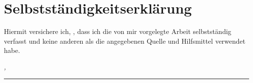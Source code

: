 %
\chapter*{Selbstständigkeitserklärung}
\label{sec:declaration}
\thispagestyle{empty}

Hiermit versichere ich, {\thesisName}, dass ich die von mir vorgelegte Arbeit
\emph{\thesisTitle} selbstständig verfasst und keine anderen als die angegebenen
Quelle und Hilfsmittel verwendet habe.

\smallskip

\noindent\textit{\thesisUniversityCity, \thesisDate}

\smallskip

\begin{flushright}
	\begin{minipage}{5cm}
		\rule{\textwidth}{1pt}
		\centering\thesisName
	\end{minipage}
\end{flushright}

